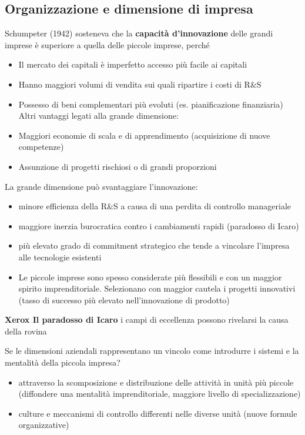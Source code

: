 \documentclass{article}
\begin{document}
\subsection{Organizzazione e dimensione di impresa}
Schumpeter (1942) sosteneva che la \textbf{capacità d’innovazione} delle
grandi imprese è superiore a quella delle piccole imprese, perché
\begin{itemize}
	\item Il mercato dei capitali è imperfetto
	accesso più facile ai capitali
	\item Hanno maggiori volumi di vendita sui quali ripartire i costi di R\&S
	\item  Possesso di beni complementari più evoluti (es. pianificazione
	finanziaria)
	Altri vantaggi legati alla grande dimensione:
	\item  Maggiori economie di scala e di apprendimento (acquisizione di
	nuove competenze)
	\item  Assunzione di progetti rischiosi o di grandi proporzioni
\end{itemize}

La grande dimensione può svantaggiare l’innovazione:

\begin{itemize}
\item	 minore efficienza della R\&S a causa di una perdita di controllo manageriale
\item maggiore inerzia burocratica contro i cambiamenti rapidi (paradosso
di Icaro)
\item più elevato grado di commitment strategico che tende a vincolare
l’impresa alle tecnologie esistenti
\item Le piccole imprese sono spesso considerate più flessibili e con un
maggior spirito imprenditoriale. Selezionano con maggior cautela i
progetti innovativi (tasso di successo più elevato nell’innovazione di
prodotto)
\end{itemize}


\textbf{Xerox  Il paradosso di Icaro}
i campi di eccellenza possono rivelarsi la causa della rovina

Se le dimensioni aziendali rappresentano un vincolo come
introdurre i sistemi e la mentalità della piccola impresa?

\begin{itemize}
\item 	attraverso la scomposizione e distribuzione delle attività in
	unità più piccole (diffondere una mentalità imprenditoriale,
	maggiore livello di specializzazione)
\item culture e meccanismi di controllo differenti nelle diverse unità
	(nuove formule organizzative)

\end{itemize}
\end{document}
